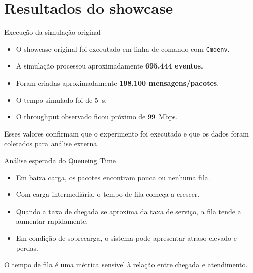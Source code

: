 \documentclass[aspectratio=169]{beamer}
\begin{document}
\section{Resultados do showcase}

\begin{frame}{Execução da simulação original}
\begin{itemize}
    \item O showcase original foi executado em linha de comando com \texttt{Cmdenv}.
    \item A simulação processou aproximadamente \textbf{695.444 eventos}.
    \item Foram criadas aproximadamente \textbf{198.100 mensagens/pacotes}.
    \item O tempo simulado foi de \SI{5}{s}.
    \item O throughput observado ficou próximo de \SI{99}{Mbps}.
\end{itemize}

\begin{informacao}
Esses valores confirmam que o experimento foi executado e que os dados foram coletados para análise externa.
\end{informacao}
\end{frame}

\begin{frame}{Análise esperada do Queueing Time}
\begin{itemize}
    \item Em baixa carga, os pacotes encontram pouca ou nenhuma fila.
    \item Com carga intermediária, o tempo de fila começa a crescer.
    \item Quando a taxa de chegada se aproxima da taxa de serviço, a fila tende a aumentar rapidamente.
    \item Em condição de sobrecarga, o sistema pode apresentar atraso elevado e perdas.
\end{itemize}

\begin{informacao}
O tempo de fila é uma métrica sensível à relação entre chegada e atendimento.
\end{informacao}
\end{frame}
\end{document}
